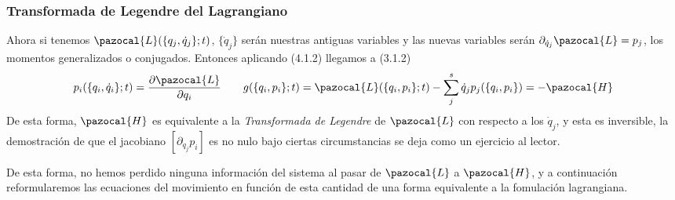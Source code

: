 \subsubsection{Transformada de Legendre del Lagrangiano}
Ahora si tenemos $\pazocal{L}(\{q_j,\dot{q}_j\};t)$, $\{\dot{q}_j\}$ serán nuestras antiguas variables y las nuevas variables serán $\partial_{\dot{q}_j}\pazocal{L}=p_j$, los momentos generalizados o conjugados. Entonces aplicando (4.1.2) llegamos a (3.1.2)
\begin{equation} \label{4.1.3}
        p_i(\{q_i,\dot{q}_i\};t)=\frac{\partial \pazocal{L}}{\partial q_i} \ \ \ \ \ \  g(\{q_i,p_i\};t) =\pazocal{L}(\{q_i,p_i\};t) -\sum_j^s \dot{q}_j p_j(\{q_i,p_i\}) = -\pazocal{H}
\end{equation} 
De esta forma, $\pazocal{H}$ es equivalente a la \textit{Transformada de Legendre} de $\pazocal{L}$ con respecto a los $\dot{q}_j$, y esta es inversible, la demostración de que el jacobiano $[\partial_{\dot{q}_j}p_i]$ es no nulo bajo ciertas circumstancias se deja como un ejercicio al lector.

De esta forma, no hemos perdido ninguna información del sistema al pasar de $\pazocal{L}$ a $\pazocal{H}$, y a continuación reformularemos las ecuaciones del movimiento en función de esta cantidad de una forma equivalente a la fomulación lagrangiana.
